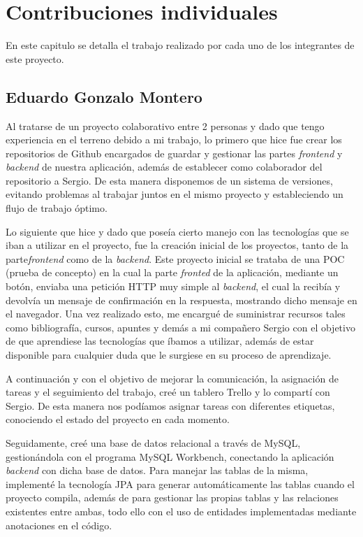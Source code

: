 \chapter{Contribuciones individuales}

En este capitulo se detalla el trabajo realizado por cada uno de los integrantes de este proyecto.

\section{Eduardo Gonzalo Montero}

Al tratarse de un proyecto colaborativo entre 2 personas y dado que tengo experiencia en el terreno debido a mi trabajo, lo primero que hice fue crear los repositorios de Github encargados de guardar y gestionar las partes \textit{frontend} y \textit{backend} de nuestra aplicación, además de establecer como colaborador del repositorio a Sergio. De esta manera disponemos de un sistema de versiones, evitando problemas al trabajar juntos en el mismo proyecto y estableciendo un flujo de trabajo óptimo. \newline

Lo siguiente que hice y dado que poseía cierto manejo con las tecnologías que se iban a utilizar en el proyecto, fue la creación inicial de los proyectos, tanto de la parte\textit{frontend} como de la  \textit{backend}. Este proyecto inicial se trataba de una POC (prueba de concepto) en la cual la parte \textit{fronted} de la aplicación, mediante un botón, enviaba una petición HTTP muy simple al \textit{backend}, el cual la recibía y devolvía un mensaje de confirmación en la respuesta, mostrando dicho mensaje en el navegador. Una vez realizado esto, me encargué de suministrar recursos tales como bibliografía, cursos, apuntes y demás a mi compañero Sergio con el objetivo de que aprendiese las tecnologías que íbamos a utilizar, además de estar disponible para cualquier duda que le surgiese en su proceso de aprendizaje. \newline

A continuación y con el objetivo de mejorar la comunicación, la asignación de tareas y el seguimiento del trabajo, creé un tablero Trello y lo compartí con Sergio. De esta manera nos podíamos asignar tareas con diferentes etiquetas, conociendo el estado del proyecto en cada momento. \newline

Seguidamente, creé una base de datos relacional a través de MySQL, gestionándola con el programa MySQL Workbench, conectando la aplicación \textit{backend} con dicha base de datos. Para manejar las tablas de la misma, implementé la tecnología JPA para generar automáticamente las tablas cuando el proyecto compila, además de para gestionar las propias tablas y las relaciones existentes entre ambas, todo ello con el uso de  entidades implementadas mediante anotaciones en el código. \newline

